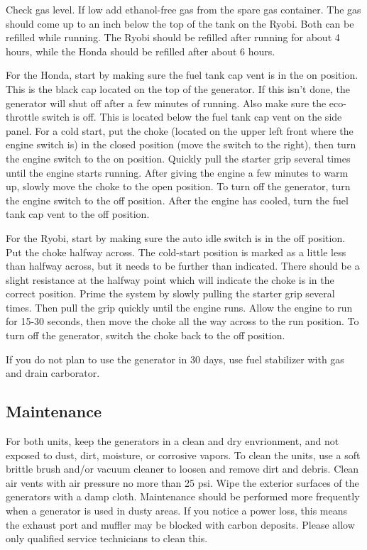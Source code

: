 \documentclass[12pt]{../SOP3_beta}
\begin{document}
\NP Check gas level. If low add ethanol-free gas from the spare gas container. The gas should come up to an inch below the top of the tank on the Ryobi. Both can be refilled while running. The Ryobi should be refilled after running for about 4 hours, while the Honda should be refilled after about 6 hours. 

\NP For the Honda, start by making sure the fuel tank cap vent is in the on position. This is the black cap located on the top of the generator. If this isn't done, the generator will shut off after a few minutes of running. Also make sure the eco-throttle switch is off. This is located below the fuel tank cap vent on the side panel. For a cold start, put the choke (located on the upper left front where the engine switch is) in the closed position (move the switch to the right), then turn the engine switch to the on position. 
  Quickly pull the starter grip several times until the engine starts running. After giving the engine a few minutes to warm up, slowly move the choke to the open position.
  To turn off the generator, turn the engine switch to the off position. After the engine has cooled, turn the fuel tank cap vent to the off position. 

\NP For the Ryobi, start by making sure the auto idle switch is in the off position. Put the choke halfway across. The cold-start position is marked as a little less than halfway across, but it needs to be further than indicated. There should be a slight resistance at the halfway point which will indicate the choke is in the correct position.
  Prime the system by slowly pulling the starter grip several times. Then pull the grip quickly until the engine runs. Allow the engine to run for 15-30 seconds, then move the choke all the way across to the run position.
  To turn off the generator, switch the choke back to the off position.

\NP If you do not plan to use the generator in 30 days, use fuel stabilizer with gas and drain carborator. 

\subsection{Maintenance}

\NP For both units, keep the generators in a clean and dry envrionment, and not exposed to dust, dirt, moisture, or corrosive vapors. To clean the units, use a soft brittle brush and/or vacuum cleaner to loosen and remove dirt and debris. Clean air vents with air pressure no more than 25 psi. Wipe the exterior surfaces of the generators with a damp cloth. Maintenance should be performed more frequently when a generator is used in dusty areas. If you notice a power loss, this means the exhaust port and muffler may be blocked with carbon deposits. Please allow only qualified service technicians to clean this.
\end{document}
